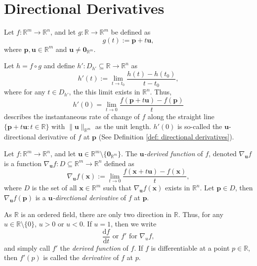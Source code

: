 

\section{Directional Derivatives}


\begin{observation}
	\label{obs: motivation of directional derivatives}
	Let $f: \mathbb R^m \to \mathbb R^n$, and let $g:\mathbb R \to \mathbb R^m$ be defined as
	$$
	g(t) := \mathbf p + t \mathbf u,
	$$
	where $\mathbf p , \mathbf u \in \mathbb R^m$ and $\mathbf u \ne \mathbf 0_{\mathbb R^m}$.
	
	Let $h = f \circ g$ and define $h': D_{h'} \subseteq \mathbb R \to \mathbb R^n$ as
	$$
	h'(t) :=\lim_{t \to t_0} \frac{h(t) - h(t_0)}{t - t_0},
	$$
	where for any $t \in D_{h'}$, the this limit exists in $\mathbb R^n$. Thus,
	$$
	h'(0) = \lim_{t \to 0} \frac{f(\mathbf p + t \mathbf u) - f(\mathbf p)}{t}
	$$
	describes the instantaneous rate of change of $f$ along the straight line $\{ \mathbf p + t\mathbf u : t \in \mathbb R \}$ with $\|\mathbf u \|_{\mathbb R^m}$ as the unit length. $h'(0)$ is so-called the $\mathbf u$-directional derivative of $f$ at $\mathbf p$ (See Definition \ref{def: directional derivatives}).
\end{observation}


\begin{definition}
	\label{def: directional derivatives}
	
	Let $f: \mathbb R^m \to \mathbb R^n$, and let $\mathbf u \in \mathbb R^{m} \setminus \{ \mathbf 0_{\mathbb R^m} \}$. The \textit{$\mathbf u$-derived function} of $f$, denoted $\nabla_{\mathbf u}f$ is a function $\nabla_{\mathbf u}f: D \subseteq \mathbb R^m \to \mathbb R^n$ defined as
	$$
	\nabla_{\mathbf u} f(\mathbf x) := \lim_{t \to 0} \frac{f(\mathbf x + t \mathbf u) - f(\mathbf x)}{t},
	$$
	where $D$ is the set of all $\mathbf x \in \mathbb R^m$ such that $\nabla_{\mathbf u}f(\mathbf x)$ exists in $\mathbb R^n$. Let $\mathbf p \in D$, then $\nabla_{\mathbf u} f(\mathbf p)$ is a \textit{$\mathbf u$-directional derivative} of $f$ at $\mathbf p$.
\end{definition}


\begin{note}
	\label{note: derivative}
	
	As $\mathbb R$ is an ordered field, there are only two direction in $\mathbb R$. Thus, for any $u \in \mathbb R \setminus \{0\}$, $u > 0$ or $u < 0$. If $u = 1$, then we write
	$$
	\frac{\mathrm df}{\mathrm d t} \text{ or } f' \text{ for } \nabla_u f,
	$$
	and simply call $f'$ the \textit{derived function} of $f$. If $f$ is differentiable at a point $p \in \mathbb R$, then $f'(p)$ is called the \textit{derivative} of $f$ at $p$.
\end{note}




